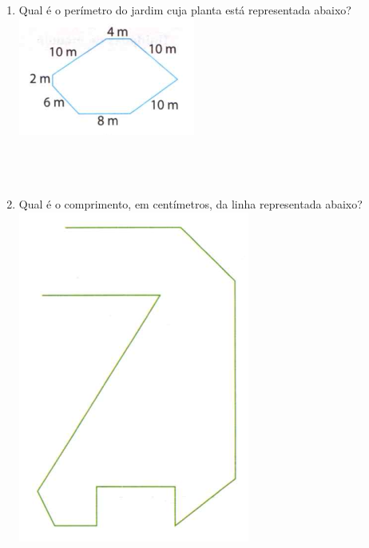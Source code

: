 \documentclass[a4paper,14pt]{article}
\begin{document}
\begin{multicols}{2}
\begin{enumerate}
			\item Qual é o perímetro do jardim cuja planta está representada abaixo? \\
			\includegraphics[width=1\linewidth]{6FMA28_imagens/imagem2} \\\\\\\\
			\item Qual é o comprimento, em centímetros, da linha representada abaixo? \\
			\includegraphics[width=1\linewidth]{6FMA28_imagens/imagem3}

\end{enumerate}
\end{multicols}
\end{document}
